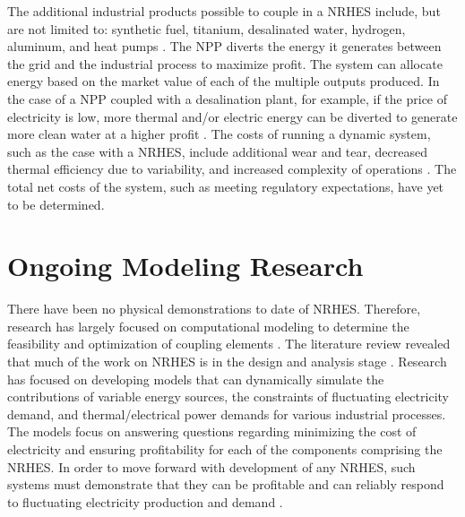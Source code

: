 The additional industrial products possible to couple in a NRHES include, but are not limited to: synthetic fuel, titanium, desalinated water, hydrogen, aluminum, and heat pumps \cite{Bienvenue2015}. The NPP diverts the energy it generates between the grid and the industrial process to maximize profit. The system can allocate energy based on the market value of each of the multiple outputs produced. In the case of a NPP coupled with a desalination plant, for example, if the price of electricity is low, more thermal and/or electric energy can be diverted to generate more clean water at a higher profit \cite {Chen2016}. The costs of running a dynamic system, such as the case with a NRHES, include additional wear and tear, decreased thermal efficiency  due to variability, and increased complexity of operations  \cite{Garcia2013}. The total net costs of the system, such as meeting regulatory expectations, have yet to be determined.

\section{Ongoing Modeling Research}
There have been no physical demonstrations to date of NRHES. Therefore, research has largely focused on computational modeling to determine the feasibility and optimization of coupling elements \cite{Rabiti2015, Boardman2013, Shropshire2012}. The literature review revealed that much of the work on NRHES is in the design and analysis stage \cite{Epiney2016, Boardman2013, Shropshire2012}. Research has focused on developing models that can dynamically simulate the contributions of variable energy sources, the constraints of fluctuating electricity demand, and thermal/electrical power demands for various industrial processes. The models focus on answering questions regarding minimizing the cost of electricity and ensuring profitability for each of the components comprising the NRHES. In order to move forward with development of any NRHES, such systems must demonstrate that they can be profitable and can reliably respond to fluctuating electricity production and demand \cite{Rabiti2015}.

